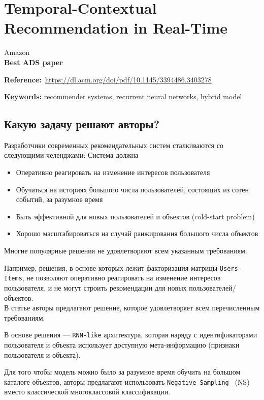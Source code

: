 \chapter{Temporal-Contextual Recommendation in Real-Time}

Amazon \\

\textbf{Best ADS paper}

\textbf{Reference:}~\url{https://dl.acm.org/doi/pdf/10.1145/3394486.3403278}

\textbf{Keywords:} recommender systems, recurrent neural networks, hybrid model

\section{Какую задачу решают авторы?}

Разработчики современных рекомендательных систем сталкиваются со следующими челенджами: Система должна

\begin{itemize}
    \item Оперативно реагировать на изменение интересов пользователя
    \item Обучаться на историях большого числа пользователей, состоящих из сотен событий, за разумное время
    \item Быть эффективной для новых пользователей и объектов (cold-start problem)
    \item Хорошо масштабироваться на случай ранжирования большого числа объектов
\end{itemize}

Многие популярные решения не удовлетворяют всем указанным требованиям. 

Например, решения, в основе которых лежит факторизация матрицы \texttt{Users-Items}, не позволяют оперативно реагировать на изменение интересов пользователя, и не могут строить рекомендации для новых пользователей/объектов. \\

В статье авторы предлагают решение, которое удовлетворяет всем перечисленным требованиям.

В основе решения --- \texttt{RNN-like} архитектура, которая наряду с идентификаторами пользователя и объекта использует доступную мета-информацию (признаки пользователя и объекта).

Для того чтобы модель можно было за разумное время обучить на большом каталоге объектов, авторы предлагают использовать \texttt{Negative Sampling}~\cite{mikolov2013distributed} (NS) вместо классической многоклассовой классификации.

